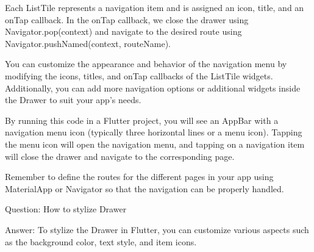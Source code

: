 Each ListTile represents a navigation item and is assigned an icon, title, and an onTap callback. In the onTap 
callback, we close the drawer using Navigator.pop(context) and navigate to the desired route using 
Navigator.pushNamed(context, routeName).

You can customize the appearance and behavior of the navigation menu by modifying the icons, titles, and onTap 
callbacks of the ListTile widgets. Additionally, you can add more navigation options or additional widgets inside 
the Drawer to suit your app's needs.

By running this code in a Flutter project, you will see an AppBar with a navigation menu icon (typically three 
horizontal lines or a menu icon). Tapping the menu icon will open the navigation menu, and tapping on a navigation 
item will close the drawer and navigate to the corresponding page.

Remember to define the routes for the different pages in your app using MaterialApp or Navigator so that the 
navigation can be properly handled.


Question: How to stylize Drawer

Answer: To stylize the Drawer in Flutter, you can customize various aspects such as the background color, text 
style, and item icons. 

